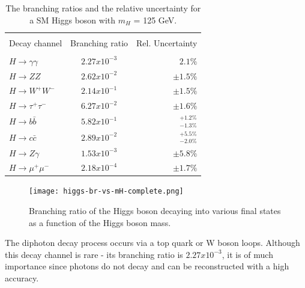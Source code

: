 \begin{table}[ht]
	{\setlength{\tabcolsep}{14pt}
		\caption[The branching ratios and the relative uncertainty for a SM Higgs boson with $m_H$ = 125 GeV.]{The branching ratios and the relative uncertainty for a SM Higgs boson with $m_H$ = 125 GeV\cite{higgs-br-vs-mH, higg-phen-3}.}
		\begin{center}
			\vspace{-6mm}
			\begin{tabular}{lcr}
				\hline \\[-2.45ex] \hline \\[-2.1ex]
				Decay channel & Branching ratio & Rel. Uncertainty \\
				\hline \\[-1.8ex]
                $H\rightarrow \gamma\gamma$ & $2.27x10^{-3}$ & $2.1\%$\\
                $H\rightarrow ZZ$ & $2.62x10^{-2}$ & $\pm 1.5\%$\\
                $H\rightarrow W^+W^-$ & $2.14x10^{-1}$ &$\pm 1.5\%$ \\
                $H\rightarrow \tau^+\tau^-$ & $6.27x10^{-2}$ &$\pm 1.6\%$ \\
                $H\rightarrow b\bar b$ & $5.82x10^{-1}$ & $^{+1.2\%}_{-1.3\%}$\\
                $H\rightarrow c \bar c$ & $2.89x10^{-2}$ &$^{+5.5\%}_{-2.0\%}$ \\
                $H\rightarrow Z\gamma$ & $1.53x10^{-3}$ & $\pm 5.8\%$\\
                $H\rightarrow \mu^+\mu^-$ & $2.18x10^{-4}$ &$\pm 1.7\%$ \\
				\hline
			\end{tabular}
			\vspace{-6mm}
		\end{center}
		\label{HiggsBRtable}}
\end{table}

\begin{figure}[ht]
	\centering
	\texttt{[image: higgs-br-vs-mH-complete.png]}
	\caption[Branching ratio of the Higgs boson decaying into various final states as a function of the Higgs boson mass.]{Branching ratio of the Higgs boson decaying into various final states as a function of the Higgs boson mass\cite{higg-phen-3}.}
	\label{higgs-br-vs-mH-complete}
\end{figure}


The diphoton decay process occurs via a top quark or W boson loops. Although this decay channel is rare - its branching ratio is $2.27x10^{-3}$, it is of much importance since photons do not decay and can be reconstructed with a high accuracy.

